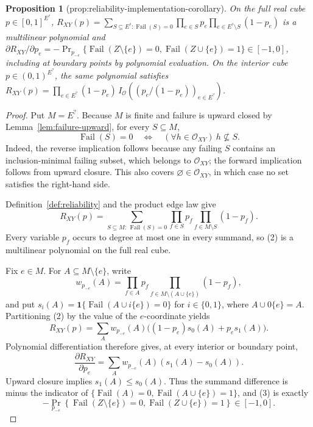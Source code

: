 \documentclass{article}
\newtheorem{proposition}{Proposition}
\begin{document}
\begin{proposition}[prop:reliability-implementation-corollary]\label{prop:reliability-implementation-corollary}
On the full real cube \(p\in[0,1]^{E^{?}}\), \(R_{XY}(p)=\sum_{S\subseteq E^{?}:\operatorname{Fail}(S)=0}\prod_{e\in S}p_e\prod_{e\in E^{?}\setminus S}(1-p_e)\) is a multilinear polynomial and \(\partial R_{XY}/\partial p_e=-\Pr_{p_{-e}}\{\operatorname{Fail}(Z\setminus\{e\})=0,\operatorname{Fail}(Z\cup\{e\})=1\}\in[-1,0]\), including at boundary points by polynomial evaluation. On the interior cube \(p\in(0,1)^{E^{?}}\), the same polynomial satisfies \(R_{XY}(p)=\prod_{e\in E^{?}}(1-p_e)\,I_{\mathcal O}((p_e/(1-p_e))_{e\in E^{?}})\).
\end{proposition}
\begin{proof}
Put \(M=E^{?}\).  Because \(M\) is finite and failure is upward closed by Lemma~\ref{lem:failure-upward}, for every \(S\subseteq M\),
\[
 \operatorname{Fail}(S)=0
 \quad\Longleftrightarrow\quad
 (\forall h\in\mathcal O_{XY})\ h\nsubseteq S. \tag{1}
\]
Indeed, the reverse implication follows because any failing \(S\) contains an inclusion-minimal failing subset, which belongs to \(\mathcal O_{XY}\); the forward implication follows from upward closure.  This also covers \(\varnothing\in\mathcal O_{XY}\), in which case no set satisfies the right-hand side.

Definition~\ref{def:reliability} and the product edge law give
\[
 R_{XY}(p)=\sum_{S\subseteq M:\,\operatorname{Fail}(S)=0}
 \prod_{f\in S}p_f\prod_{f\in M\setminus S}(1-p_f). \tag{2}
\]
Every variable \(p_f\) occurs to degree at most one in every summand, so (2) is a multilinear polynomial on the full real cube.

Fix \(e\in M\).  For \(A\subseteq M\setminus\{e\}\), write
\[
 w_{p_{-e}}(A)=\prod_{f\in A}p_f
 \prod_{f\in M\setminus(A\cup\{e\})}(1-p_f),
\]
and put \(s_i(A)=\mathbf 1\{\operatorname{Fail}(A\cup i\{e\})=0\}\) for \(i\in\{0,1\}\), where \(A\cup0\{e\}=A\).  Partitioning (2) by the value of the \(e\)-coordinate yields
\[
 R_{XY}(p)=\sum_A w_{p_{-e}}(A)\bigl((1-p_e)s_0(A)+p_es_1(A)\bigr).
\]
Polynomial differentiation therefore gives, at every interior or boundary point,
\[
 \frac{\partial R_{XY}}{\partial p_e}
 =\sum_A w_{p_{-e}}(A)(s_1(A)-s_0(A)). \tag{3}
\]
Upward closure implies \(s_1(A)\le s_0(A)\).  Thus the summand difference is minus the indicator of
\(
\{\operatorname{Fail}(A)=0,\operatorname{Fail}(A\cup\{e\})=1\}
\), and (3) is exactly
\[
 -\Pr_{p_{-e}}\!\left\{\operatorname{Fail}(Z\setminus\{e\})=0,
 \operatorname{Fail}(Z\cup\{e\})=1\right\}\in[-1,0].
\]


\end{proof}
\end{document}
